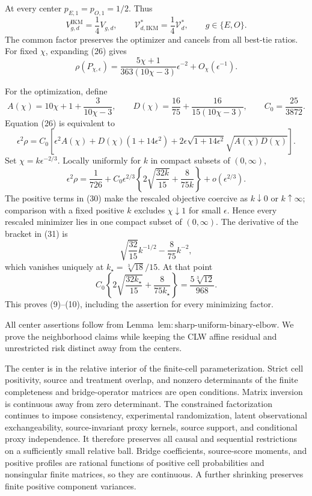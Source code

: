At every center \(p_{E,1}=p_{O,1}=1/2\).  Thus
\[
 V_{g,d}^{\mathrm{IKM}}=\frac14V_{g,d},
 \qquad
 \mathcal V_{d,\mathrm{IKM}}^*=\frac14\mathcal V_d^*,
 \qquad g\in\{E,O\}.                                     \tag{28}
\]
The common factor preserves the optimizer and cancels from all best-tie ratios.  For fixed \(\chi\), expanding (26) gives
\[
 \rho(P_{\chi,\epsilon})
 =\frac{5\chi+1}{363(10\chi-3)}\epsilon^{-2}
 +O_\chi(\epsilon^{-1}).                                  \tag{29}
\]

For the optimization, define
\[
 A(\chi)=10\chi+1+\frac3{10\chi-3},
 \qquad
 D(\chi)=\frac{16}{75}+\frac{16}{15(10\chi-3)},
 \qquad C_0=\frac{25}{3872}.
\]
Equation (26) is equivalent to
\[
 \epsilon^2\rho=C_0\left[
 \epsilon^2A(\chi)+D(\chi)(1+14\epsilon^2)
 +2\epsilon\sqrt{1+14\epsilon^2}\sqrt{A(\chi)D(\chi)}
 \right].                                                  \tag{30}
\]
Set \(\chi=k\epsilon^{-2/3}\).  Locally uniformly for \(k\) in compact subsets of \((0,\infty)\),
\[
 \epsilon^2\rho
 =\frac1{726}+C_0\epsilon^{2/3}
 \left\{2\sqrt{\frac{32k}{15}}+\frac8{75k}\right\}
 +o(\epsilon^{2/3}).                                      \tag{31}
\]
The positive terms in (30) make the rescaled objective coercive as \(k\downarrow0\) or \(k\uparrow\infty\); comparison with a fixed positive \(k\) excludes \(\chi\downarrow1\) for small \(\epsilon\).  Hence every rescaled minimizer lies in one compact subset of \((0,\infty)\).  The derivative of the bracket in (31) is
\[
 \sqrt{\frac{32}{15}}k^{-1/2}-\frac8{75}k^{-2},
\]
which vanishes uniquely at \(k_\star=\sqrt[3]{18}/15\).  At that point
\[
 C_0\left\{2\sqrt{\frac{32k_\star}{15}}+\frac8{75k_\star}\right\}
 =\frac{5\sqrt[3]{12}}{968}.
\]
This proves (9)--(10), including the assertion for every minimizing factor.

All center assertions follow from Lemma~\(\mathrm{lem{:}sharp\text{-}uniform\text{-}binary\text{-}elbow}\).  We prove the neighborhood claims while keeping the CLW affine residual and unrestricted risk distinct away from the centers.

The center is in the relative interior of the finite-cell parameterization.  Strict cell positivity, source and treatment overlap, and nonzero determinants of the finite completeness and bridge-operator matrices are open conditions.  Matrix inversion is continuous away from zero determinant.  The constrained factorization continues to impose consistency, experimental randomization, latent observational exchangeability, source-invariant proxy kernels, source support, and conditional proxy independence.  It therefore preserves all causal and sequential restrictions on a sufficiently small relative ball.  Bridge coefficients, source-score moments, and positive profiles are rational functions of positive cell probabilities and nonsingular finite matrices, so they are continuous.  A further shrinking preserves finite positive component variances.

